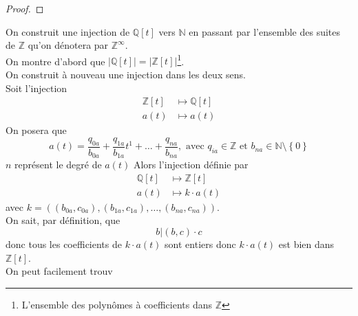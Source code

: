 \documentclass[11pt, a4paper, twoside]{article}
\begin{document}
\begin{proof}






\end{proof}

On construit une injection de $\mathbb{Q}[t]$ vers $\mathbb{N}$ en passant par l'ensemble des suites de $\mathbb{Z}$ qu'on dénotera par $\mathbb{Z}^{ \infty}$.\\
On montre d'abord que  $|\mathbb{Q}[t]| =  | \mathbb{Z}[t]|$\footnote{L'ensemble des polynômes à coefficients dans $\mathbb{Z}$ }.\\
On construit à nouveau une injection dans les deux sens.\\
Soit l'injection
\begin{align*}
	\mathbb{Z}[t] &\mapsto \mathbb{Q}[t]\\
	a(t) &\mapsto a(t)
\end{align*}
On posera que
\[ 
	a(t) = \frac{q_{0a} }{b_{0a}} + \frac{ q_{1a} }{b_{1a} } t^{1} + \ldots + \frac{q_{na} }{b_{na} }, \text{ avec } q_{ia} \in \mathbb{Z} \text{ et } b_{na} \in \mathbb{N} \setminus \left\{ 0 \right\} 
\]
$n$ représent le degré de $a(t)$
Alors l'injection définie par 
\begin{align*}
	\mathbb{Q}[t] & \mapsto \mathbb{Z}[t]\\
	a(t) &\mapsto k \cdot a(t)
\end{align*}
avec $k= ( (b_{0a} ,c_{0a} ),(b_{1a} ,c_{1a} ), \ldots, (b_{na} ,c_{na}))$.\\
On sait, par définition, que 
\[ 
	b | (b,c) \cdot c
\]
donc tous les coefficients de $k \cdot a(t)$ sont entiers donc $k \cdot a(t)$ est bien dans $\mathbb{Z}[t]$.\\
On peut facilement trouv
\end{document}
